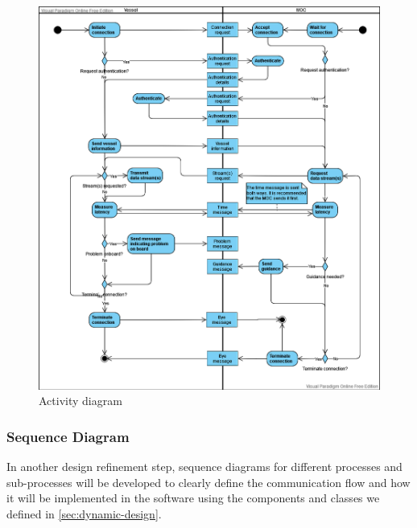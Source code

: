 \begin{figure}[ht]
	\centering
	\includegraphics[width=\linewidth]{diagrams/activity-diagram}
	\caption{Activity diagram}
	\label{fig:activity-diagram}
\end{figure}

\subsubsection{Sequence Diagram}

In another design refinement step, sequence diagrams for different processes and sub-processes will be developed to clearly define the communication flow and how it will be implemented in the software using the components and classes we defined in \ref{sec:dynamic-design}.
